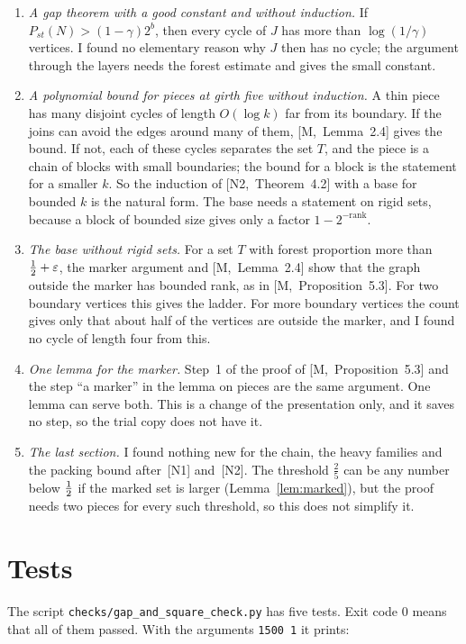 \documentclass[11pt]{article}
\newcommand{\M}[1]{[M,~#1]}
\newcommand{\NN}[1]{[N2,~#1]}
\begin{document}
\begin{enumerate}[leftmargin=1.6em]
a full star excludes it. Test~E of the script verifies these three statements.
\item \emph{A gap theorem with a good constant and without induction.} If
$P_{st}(N)>(1-\gamma)2^{b}$, then every cycle of $J$ has more than $\log(1/\gamma)$ vertices. I
found no elementary reason why $J$ then has no cycle; the argument through the layers needs the
forest estimate and gives the small constant.
\item \emph{A polynomial bound for pieces at girth five without induction.} A thin piece has
many disjoint cycles of length $O(\log k)$ far from its boundary. If the joins can avoid the
edges around many of them, \M{Lemma~2.4} gives the bound. If not, each of these cycles separates
the set $T$, and the piece is a chain of blocks with small boundaries; the bound for a block is
the statement for a smaller $k$. So the induction of \NN{Theorem~4.2} with a base for bounded
$k$ is the natural form. The base needs a statement on rigid sets, because a block of bounded
size gives only a factor $1-2^{-\text{rank}}$.
\item \emph{The base without rigid sets.} For a set $T$ with forest proportion more than
$\tfrac12+\varepsilon$, the marker argument and \M{Lemma~2.4} show that the graph outside the
marker has bounded rank, as in \M{Proposition~5.3}. For two boundary vertices this gives the
ladder. For more boundary vertices the count gives only that about half of the vertices are
outside the marker, and I found no cycle of length four from this.
\item \emph{One lemma for the marker.} Step~1 of the proof of \M{Proposition~5.3} and the step
``a marker'' in the lemma on pieces are the same argument. One lemma can serve both. This is a
change of the presentation only, and it saves no step, so the trial copy does not have it.
\item \emph{The last section.} I found nothing new for the chain, the heavy families and the
packing bound after~[N1] and~[N2]. The threshold $\frac25$ can be any number below $\tfrac12$ if the
marked set is larger (Lemma~\ref{lem:marked}), but the proof needs two pieces for every such
threshold, so this does not simplify it.
\end{enumerate}

\section{Tests}\label{sec:tests}

The script \texttt{checks/gap\_and\_square\_check.py} has five tests. Exit code $0$ means that
all of them passed. With the arguments \texttt{1500 1} it prints:
\end{document}

